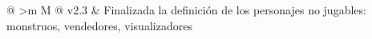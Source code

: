 \begin{longtable}[H]{
    @{}
    >{\Centering}m{}
    M{\tabcolsep\relax}
    @{}
    }
    v2.3 & Finalizada la definición de los personajes no jugables: monstruos, vendedores, visualizadores\\
\end{longtable}